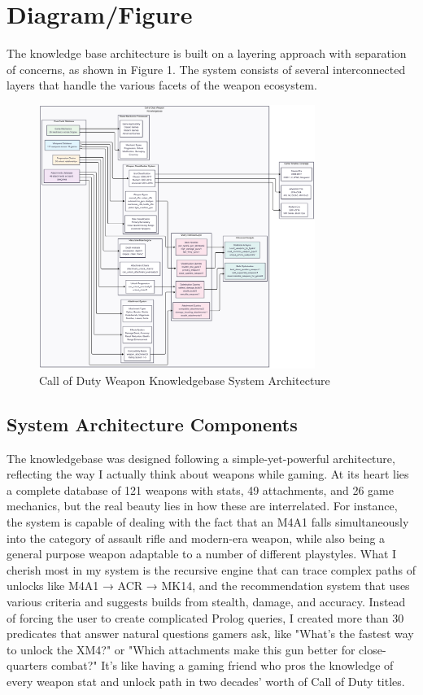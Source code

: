 \documentclass[12pt,a4paper]{article}
\begin{document}
\section{Diagram/Figure}

The knowledge base architecture is built on a layering approach with separation
of concerns, as shown in Figure 1. The system consists of several
interconnected layers that handle the various facets of the weapon ecosystem.

\begin{figure}[H]
    \centering
    \includegraphics[width=0.8\textwidth]{../diagrams/knowledgebase-diagram-vertical.png}
    \caption{Call of Duty Weapon Knowledgebase System Architecture}
\end{figure}

\subsection{System Architecture Components}

The knowledgebase was designed following a simple-yet-powerful architecture,
reflecting the way I actually think about weapons while gaming. At its heart
lies a complete database of 121 weapons with stats, 49 attachments, and 26 game
mechanics, but the real beauty lies in how these are interrelated. For
instance, the system is capable of dealing with the fact that an M4A1 falls
simultaneously into the category of assault rifle and modern-era weapon, while
also being a general purpose weapon adaptable to a number of different
playstyles. What I cherish most in my system is the recursive engine that can
trace complex paths of unlocks like M4A1 → ACR → MK14, and the recommendation
system that uses various criteria and suggests builds from stealth, damage, and
accuracy. Instead of forcing the user to create complicated Prolog queries, I
created more than 30 predicates that answer natural questions gamers ask, like
"What's the fastest way to unlock the XM4?" or "Which attachments make this gun
better for close-quarters combat?" It's like having a gaming friend who pros
the knowledge of every weapon stat and unlock path in two decades' worth of
Call of Duty titles.
\end{document}
